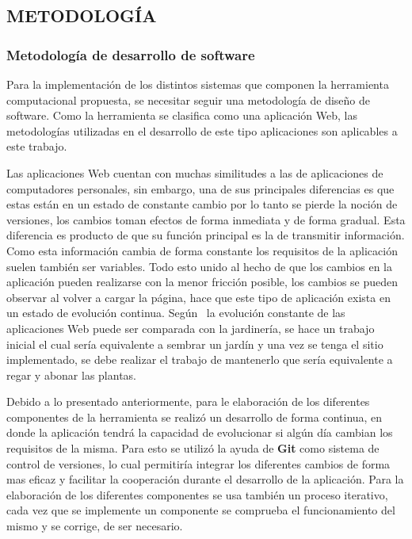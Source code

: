 
\subsection{METODOLOGÍA}
\subsubsection{Metodología de desarrollo de software}

Para la implementación de los distintos sistemas que componen la herramienta
computacional propuesta, se necesitar seguir una metodología de diseño de
software. Como la herramienta se clasifica como una aplicación Web, las
metodologías utilizadas en el desarrollo de este tipo aplicaciones son
aplicables a este trabajo.

Las aplicaciones Web cuentan con muchas similitudes a las de aplicaciones de
computadores personales, sin embargo, una de sus principales diferencias es que
estas están en un estado de constante cambio por lo tanto
se pierde la noción de versiones, los cambios toman efectos de forma inmediata
y de forma gradual. Esta diferencia es producto de que su función principal es
la de transmitir información. Como esta información cambia de forma constante
los requisitos de la aplicación suelen también ser variables. Todo esto unido
al hecho de que los cambios en la aplicación pueden realizarse con la
menor fricción posible, los cambios se pueden observar al volver a cargar la
página, hace que este tipo de aplicación  exista en un estado de evolución
continua. Según \textcite{pressman2002}\  la evolución constante de las aplicaciones
Web puede ser comparada con la jardinería, se hace un trabajo inicial el cual
sería equivalente a sembrar un jardín y una vez se tenga el sitio implementado,
se debe realizar el trabajo de mantenerlo que sería equivalente a regar y
abonar las plantas.

Debido a lo presentado anteriormente, para le elaboración de los diferentes
componentes de la herramienta se realizó un desarrollo de forma continua,
en donde la aplicación tendrá la capacidad de evolucionar si algún día
cambian los requisitos de la misma. Para esto se utilizó la ayuda de
\textbf{Git} como sistema de control de versiones, lo cual permitiría integrar
los diferentes cambios de forma mas eficaz y facilitar la cooperación durante
el desarrollo de la aplicación. Para la elaboración de los diferentes
componentes se usa también un proceso iterativo, cada vez que se implemente
un componente se comprueba el funcionamiento del mismo y se corrige, de ser
necesario.

